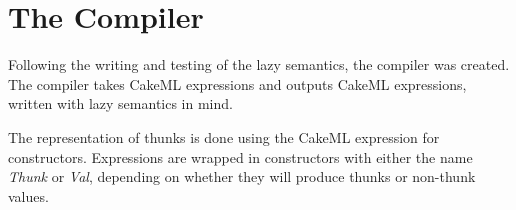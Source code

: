\section{The Compiler}

Following the writing and testing of the lazy semantics, the compiler was
created. The compiler takes CakeML expressions and outputs CakeML expressions,
written with lazy semantics in mind.

The representation of thunks is done using the CakeML expression for
constructors. Expressions are wrapped in constructors with either the name
\textit{Thunk} or \textit{Val}, depending on whether they will produce thunks or
non-thunk values. 
